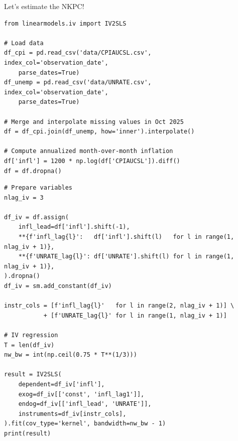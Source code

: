 \begin{frame}[fragile]
Let's estimate the NKPC!
\bigskip

\scriptsize
\begin{verbatim}
from linearmodels.iv import IV2SLS

# Load data
df_cpi = pd.read_csv('data/CPIAUCSL.csv', index_col='observation_date',
    parse_dates=True)
df_unemp = pd.read_csv('data/UNRATE.csv', index_col='observation_date',
    parse_dates=True)

# Merge and interpolate missing values in Oct 2025
df = df_cpi.join(df_unemp, how='inner').interpolate()

# Compute annualized month-over-month inflation
df['infl'] = 1200 * np.log(df['CPIAUCSL']).diff()
df = df.dropna()
\end{verbatim}
\end{frame}

\begin{frame}[fragile]
\scriptsize
\begin{verbatim}
# Prepare variables
nlag_iv = 3

df_iv = df.assign(
    infl_lead=df['infl'].shift(-1),
    **{f'infl_lag{l}':   df['infl'].shift(l)   for l in range(1, nlag_iv + 1)},
    **{f'UNRATE_lag{l}': df['UNRATE'].shift(l) for l in range(1, nlag_iv + 1)},
).dropna()
df_iv = sm.add_constant(df_iv)

instr_cols = [f'infl_lag{l}'   for l in range(2, nlag_iv + 1)] \
           + [f'UNRATE_lag{l}' for l in range(1, nlag_iv + 1)]

# IV regression
T = len(df_iv)
nw_bw = int(np.ceil(0.75 * T**(1/3)))

result = IV2SLS(
    dependent=df_iv['infl'],
    exog=df_iv[['const', 'infl_lag1']],
    endog=df_iv[['infl_lead', 'UNRATE']],
    instruments=df_iv[instr_cols],
).fit(cov_type='kernel', bandwidth=nw_bw - 1)
print(result)
\end{verbatim}
\end{frame}

